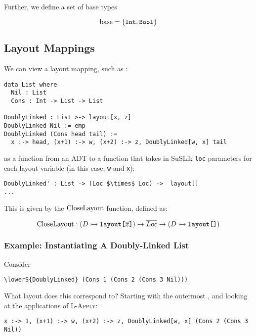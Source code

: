 \documentclass[10pt]{article}
\begin{document}
Further, we define a set of base types

\[
  \textnormal{base} = \{\texttt{Int}, \texttt{Bool}\}
\]

\subsection{Layout Mappings}

We can view a layout mapping, such as :

\begin{lstlisting}
data List where
  Nil : List
  Cons : Int -> List -> List

DoublyLinked : List >-> layout[x, z]
DoublyLinked Nil := emp
DoublyLinked (Cons head tail) := 
  x :-> head, (x+1) :-> w, (x+2) :-> z, DoublyLinked[w, x] tail
\end{lstlisting}

\noindent
as a function from an ADT to a function that takes in SuSLik \verb|loc| parameters for each
layout variable (in this case, \verb|w| and \verb|x|):

\begin{lstlisting}
DoublyLinked' : List -> (Loc $\times$ Loc) ->  layout[]
...
\end{lstlisting}

\noindent
This is given by the $\textnormal{CloseLayout}$ function, defined as:

\begin{equation*}
  \textnormal{CloseLayout} : (D \rightarrowtail \textnormal{\texttt{layout[$\overline{x}$]}}) \rightarrow \overline{Loc} \rightarrow (D \rightarrowtail \textnormal{\texttt{layout[$$]}})
\end{equation*}

\subsubsection{Example: Instantiating A Doubly-Linked List}

Consider

\begin{lstlisting}
\lowerS{DoublyLinked} (Cons 1 (Cons 2 (Cons 3 Nil)))
\end{lstlisting}

What layout does this correspond to? Starting with the outermost , and looking
at the applications of \textsc{L-Apply}:

\begin{lstlisting}
x :-> 1, (x+1) :-> w, (x+2) :-> z, DoublyLinked[w, x] (Cons 2 (Cons 3 Nil))
\end{lstlisting}
\end{document}
